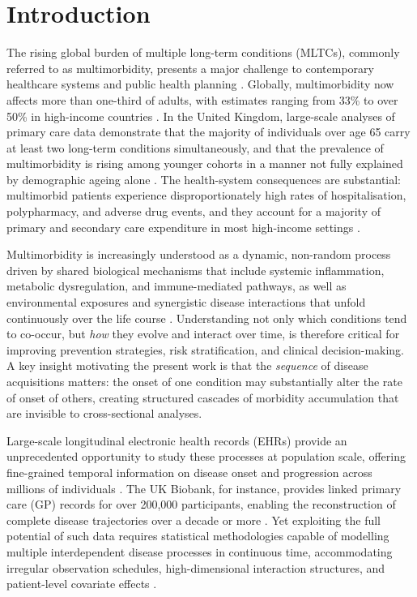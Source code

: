 \documentclass[12pt]{article}
\begin{document}
\newpage
\linenumbers

\section{Introduction}
\label{sec:intro}

The rising global burden of multiple long-term conditions (MLTCs), commonly
referred to as multimorbidity, presents a major challenge to contemporary
healthcare systems and public health planning \citep{barnett2012epidemiology,
skou2022multimorbidity}.  Globally, multimorbidity now affects more than
one-third of adults, with estimates ranging from 33\% to over 50\% in
high-income countries \citep{skou2022multimorbidity, kuan2019chronological}.
In the United Kingdom, large-scale analyses of primary care data demonstrate
that the majority of individuals over age 65 carry at least two long-term
conditions simultaneously, and that the prevalence of multimorbidity is rising
among younger cohorts in a manner not fully explained by demographic ageing
alone \citep{barnett2012epidemiology}.  The health-system consequences are
substantial: multimorbid patients experience disproportionately high rates of
hospitalisation, polypharmacy, and adverse drug events, and they account for
a majority of primary and secondary care expenditure in most high-income
settings \citep{skou2022multimorbidity}.

Multimorbidity is increasingly understood as a dynamic, non-random process
driven by shared biological mechanisms that include systemic inflammation,
metabolic dysregulation, and immune-mediated pathways, as well as 
environmental exposures and synergistic disease interactions that unfold
continuously over the life course \citep{kuan2019chronological,
cheng2024chronic}.  Understanding not only which conditions tend to
co-occur, but \emph{how} they evolve and interact over time, is therefore
critical for improving prevention strategies, risk stratification, and clinical
decision-making.  A key insight motivating the present work is that the
\emph{sequence} of disease acquisitions matters: the onset of one condition
may substantially alter the rate of onset of others, creating structured
cascades of morbidity accumulation that are invisible to cross-sectional
analyses.

Large-scale longitudinal electronic health records (EHRs) provide an
unprecedented opportunity to study these processes at population scale, offering
fine-grained temporal information on disease onset and progression across
millions of individuals \citep{hemingway2018big}.  The UK Biobank, for instance,
provides linked primary care (GP) records for over 200,000 participants, enabling
the reconstruction of complete disease trajectories over a decade or more
\citep{kuan2019chronological}.  Yet exploiting the full potential of such data
requires statistical methodologies capable of modelling multiple interdependent
disease processes in continuous time, accommodating irregular observation
schedules, high-dimensional interaction structures, and patient-level covariate
effects \citep{jackson2022comparison}.
\end{document}
